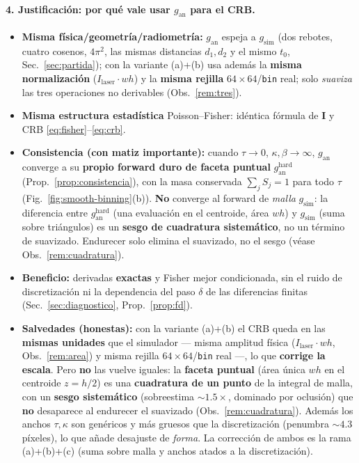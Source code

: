 \documentclass[11pt,a4paper]{article}
\theoremstyle{plain}
\theoremstyle{definition}
\newcommand{\matr}[1]{\mathbf{#1}}
\begin{document}
\paragraph{4. Justificaci\'on: por qu\'e vale usar $g_{\mathrm{an}}$ para el CRB.}
\begin{itemize}[nosep]
    \item \textbf{Misma f\'isica/geometr\'ia/radiometr\'ia:} $g_{\mathrm{an}}$
    espeja a $g_{\mathrm{sim}}$ (dos rebotes, cuatro cosenos, $4\pi^2$, las mismas
    distancias $d_1,d_2$ y el mismo $t_0$, Sec.~\ref{sec:partida}); con la
    variante (a)+(b) usa adem\'as la \textbf{misma normalizaci\'on}
    ($I_{\mathrm{laser}}\!\cdot\!w h$) y la \textbf{misma rejilla}
    $64\times64$/\texttt{bin} real; solo \emph{suaviza} las tres operaciones no
    derivables (Obs.~\ref{rem:tres}).
    \item \textbf{Misma estructura estad\'istica} Poisson--Fisher: id\'entica
    f\'ormula de $\matr I$ y CRB \eqref{eq:fisher}--\eqref{eq:crb}.
    \item \textbf{Consistencia (con matiz importante):} cuando $\tau\to0$,
    $\kappa,\beta\to\infty$, $g_{\mathrm{an}}$ converge a su \textbf{propio forward
    duro de faceta puntual} $g^{\mathrm{hard}}_{\mathrm{an}}$
    (Prop.~\ref{prop:consistencia}), con la masa conservada $\sum_j S_j=1$ para
    todo $\tau$ (Fig.~\ref{fig:smooth-binning}(b)). \textbf{No} converge al forward
    de \emph{malla} $g_{\mathrm{sim}}$: la diferencia entre
    $g^{\mathrm{hard}}_{\mathrm{an}}$ (una evaluaci\'on en el centroide, \'area
    $w h$) y $g_{\mathrm{sim}}$ (suma sobre tri\'angulos) es un \textbf{sesgo de
    cuadratura sistem\'atico}, no un t\'ermino de suavizado. Endurecer solo elimina
    el suavizado, no el sesgo (v\'ease Obs.~\ref{rem:cuadratura}).
    \item \textbf{Beneficio:} derivadas \textbf{exactas} y Fisher mejor
    condicionada, sin el ruido de discretizaci\'on ni la dependencia del paso
    $\delta$ de las diferencias finitas (Sec.~\ref{sec:diagnostico},
    Prop.~\ref{prop:fd}).
    \item \textbf{Salvedades (honestas):} con la variante (a)+(b) el CRB queda en
    las \textbf{mismas unidades} que el simulador --- misma amplitud f\'isica
    ($I_{\mathrm{laser}}\!\cdot\!w h$, Obs.~\ref{rem:area}) y misma rejilla
    $64\times64$/\texttt{bin} real ---, lo que \textbf{corrige la escala}. Pero
    \textbf{no} las vuelve iguales: la \textbf{faceta puntual} (\'area \'unica $w h$
    en el centroide $z=h/2$) es una \textbf{cuadratura de un punto} de la integral
    de malla, con un \textbf{sesgo sistem\'atico} (sobreestima $\sim1.5\times$,
    dominado por oclusi\'on) que \textbf{no} desaparece al endurecer el suavizado
    (Obs.~\ref{rem:cuadratura}). Adem\'as los anchos $\tau,\kappa$ son gen\'ericos y
    m\'as gruesos que la discretizaci\'on (penumbra $\sim4.3$ p\'ixeles), lo que
    a\~nade desajuste de \emph{forma}. La correcci\'on de ambos es la rama
    (a)+(b)+(c) (suma sobre malla y anchos atados a la discretizaci\'on).
\end{itemize}
\end{document}
